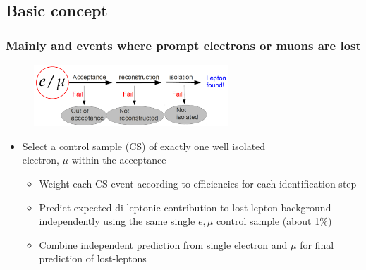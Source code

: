 \documentclass{beamer}
\begin{document}
\subsection{Basic concept}
\begin{frame}
  \frametitle{Mainly \ttbar and \wpj events where prompt electrons or muons are lost}
   \begin{figure}
 \centering
  \includegraphics[width = 0.65\textwidth]{figures/lepton_veto_sketch.png}
 \end{figure}
      \begin{itemize}
      \item Select a control sample (CS) of exactly one well isolated \\electron, $\mu$ within the acceptance
        \begin{itemize}
        \item Weight each CS event according to efficiencies for each identification step
        \item Predict expected di-leptonic \ttbar contribution to lost-lepton background independently using the same single $e,\mu$ control sample (about 1\%)
        \item Combine independent prediction from single electron and $\mu$ for final prediction of lost-leptons
        \end{itemize}
      \end{itemize}
\end{frame}
\end{document}

